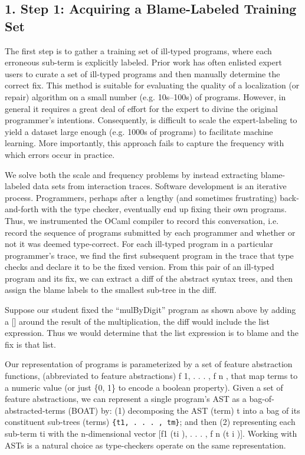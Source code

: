\subsection{1. Step 1: Acquiring a Blame-Labeled Training Set}

The first step is to gather a training set of ill-typed programs, where each erroneous sub-term is explicitly labeled. Prior work has often enlisted expert users to curate a set of ill-typed programs and then manually determine the correct fix. This method is suitable for evaluating the quality of a localization (or repair) algorithm on a small number (e.g. 10s–100s) of programs. However, in general it requires a great deal of effort for the expert to divine the original programmer’s intentions. Consequently, is difficult to scale the expert-labeling to yield a dataset large enough (e.g. 1000s of programs) to facilitate machine learning. More importantly, this approach fails to capture the frequency with which errors occur in practice.

 We solve both the scale and frequency problems by instead extracting blame-labeled data sets from interaction traces. Software development is an iterative process. Programmers, perhaps after a lengthy (and sometimes frustrating) back-and-forth with the type checker, eventually end up fixing their own programs. Thus, we instrumented the OCaml compiler to record this conversation, i.e. record the sequence of programs submitted by each programmer and whether or not it was deemed type-correct. For each ill-typed program in a particular programmer’s trace, we find the first subsequent program in the trace that type checks and declare it to be the fixed version. From this pair of an ill-typed program and its fix, we can extract a diff of the abstract syntax trees, and then assign the blame labels to the smallest sub-tree in the diff.

 Suppose our student fixed the “mulByDigit” program as shown above by adding a [] around the result of the multiplication, the diff would include the list expression. Thus we would determine that the list expression is to blame and the fix is that list.

 Our representation of programs is parameterized by a set of feature abstraction functions, (abbreviated to feature abstractions) f 1, . . . , f n , that map terms to a numeric value (or just \{0, 1\} to encode a boolean property). Given a set of feature abstractions, we can represent a single program’s AST as a bag-of-abstracted-terms (BOAT) by: (1) decomposing the AST (term) t into a bag of its constituent sub-trees (terms) \texttt{\{t1, . . . , tm\}}; and then (2) representing each sub-term ti with the n-dimensional vector [f1 (ti ), . . . , f n (t i )]. Working with ASTs is a natural choice as type-checkers operate on the same representation.

